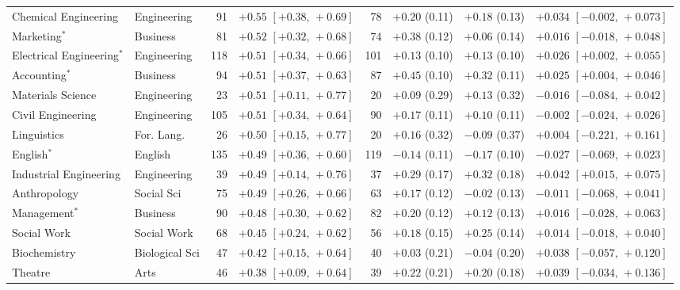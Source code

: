 \documentclass[11pt]{article}
\begin{document}
{\begin{longtable}{@{}>{\raggedright\arraybackslash}p{3.2cm}>{\raggedright\arraybackslash}p{1.9cm}rcrccc@{}}
Chemical Engineering & Engineering & 91 & ${+}0.55$ $[{+}0.38,\,{+}0.69]$ & 78 & ${+}0.20$ (0.11) & ${+}0.18$ (0.13) & ${+}0.034$ $[{-}0.002,\,{+}0.073]$ \\
Marketing$^{*}$ & Business & 81 & ${+}0.52$ $[{+}0.32,\,{+}0.68]$ & 74 & ${+}0.38$ (0.12) & ${+}0.06$ (0.14) & ${+}0.016$ $[{-}0.018,\,{+}0.048]$ \\
Electrical Engineering$^{*}$ & Engineering & 118 & ${+}0.51$ $[{+}0.34,\,{+}0.66]$ & 101 & ${+}0.13$ (0.10) & ${+}0.13$ (0.10) & ${+}0.026$ $[{+}0.002,\,{+}0.055]$ \\
Accounting$^{*}$ & Business & 94 & ${+}0.51$ $[{+}0.37,\,{+}0.63]$ & 87 & ${+}0.45$ (0.10) & ${+}0.32$ (0.11) & ${+}0.025$ $[{+}0.004,\,{+}0.046]$ \\
Materials Science & Engineering & 23 & ${+}0.51$ $[{+}0.11,\,{+}0.77]$ & 20 & ${+}0.09$ (0.29) & ${+}0.13$ (0.32) & ${-}0.016$ $[{-}0.084,\,{+}0.042]$ \\
Civil Engineering & Engineering & 105 & ${+}0.51$ $[{+}0.34,\,{+}0.64]$ & 90 & ${+}0.17$ (0.11) & ${+}0.10$ (0.11) & ${-}0.002$ $[{-}0.024,\,{+}0.026]$ \\
Linguistics & For. Lang. & 26 & ${+}0.50$ $[{+}0.15,\,{+}0.77]$ & 20 & ${+}0.16$ (0.32) & ${-}0.09$ (0.37) & ${+}0.004$ $[{-}0.221,\,{+}0.161]$ \\
English$^{*}$ & English & 135 & ${+}0.49$ $[{+}0.36,\,{+}0.60]$ & 119 & ${-}0.14$ (0.11) & ${-}0.17$ (0.10) & ${-}0.027$ $[{-}0.069,\,{+}0.023]$ \\
Industrial Engineering & Engineering & 39 & ${+}0.49$ $[{+}0.14,\,{+}0.76]$ & 37 & ${+}0.29$ (0.17) & ${+}0.32$ (0.18) & ${+}0.042$ $[{+}0.015,\,{+}0.075]$ \\
Anthropology & Social Sci & 75 & ${+}0.49$ $[{+}0.26,\,{+}0.66]$ & 63 & ${+}0.17$ (0.12) & ${-}0.02$ (0.13) & ${-}0.011$ $[{-}0.068,\,{+}0.041]$ \\
Management$^{*}$ & Business & 90 & ${+}0.48$ $[{+}0.30,\,{+}0.62]$ & 82 & ${+}0.20$ (0.12) & ${+}0.12$ (0.13) & ${+}0.016$ $[{-}0.028,\,{+}0.063]$ \\
Social Work & Social Work & 68 & ${+}0.45$ $[{+}0.24,\,{+}0.62]$ & 56 & ${+}0.18$ (0.15) & ${+}0.25$ (0.14) & ${+}0.014$ $[{-}0.018,\,{+}0.040]$ \\
Biochemistry & Biological Sci & 47 & ${+}0.42$ $[{+}0.15,\,{+}0.64]$ & 40 & ${+}0.03$ (0.21) & ${-}0.04$ (0.20) & ${+}0.038$ $[{-}0.057,\,{+}0.120]$ \\
Theatre & Arts & 46 & ${+}0.38$ $[{+}0.09,\,{+}0.64]$ & 39 & ${+}0.22$ (0.21) & ${+}0.20$ (0.18) & ${+}0.039$ $[{-}0.034,\,{+}0.136]$ \\

\end{longtable}}
\end{document}
